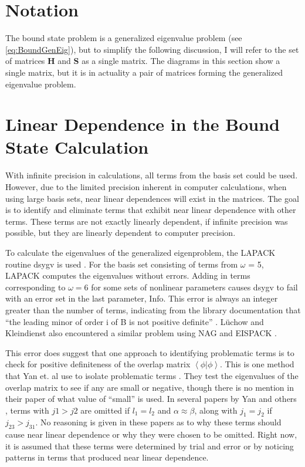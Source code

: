 \documentclass[Dissertation.tex]{subfiles}
\begin{document}
\section{Notation}
\label{sec:CompNotation}
The bound state problem is a generalized eigenvalue problem (see \cref{eq:BoundGenEig}), but to simplify the following discussion, I will refer to the set of matrices \textbf{H} and \textbf{S} as a single matrix. The diagrams in this section show a single matrix, but it is in actuality a pair of matrices forming the generalized eigenvalue problem.

\section{Linear Dependence in the Bound State Calculation}
With infinite precision in calculations, all terms from the basis set could be used. However, due to the limited precision inherent in computer calculations, when using large basis sets, near linear dependences will exist in the matrices. The goal is to identify and eliminate terms that exhibit near linear dependence with other terms. These terms are not exactly linearly dependent, if infinite precision was possible, but they are linearly dependent to computer precision.

To calculate the eigenvalues of the generalized eigenproblem, the LAPACK routine dsygv is used \cite{dsygv}. For the basis set consisting of terms from $\omega$ = 5, LAPACK computes the eigenvalues without errors. Adding in terms corresponding to $\omega = 6$ for some sets of nonlinear parameters causes dsygv to fail with an error set in the last parameter, Info. This error is always an integer greater than the number of terms, indicating from the library documentation that ``the leading minor of order i of B is not positive definite'' \cite{dsygv}. L\"uchow and Kleindienst also encountered a similar problem using NAG and EISPACK \cite{Luchow1993}.

This error does suggest that one approach to identifying problematic terms is to check for positive definiteness of the overlap matrix $\left\langle \phi | \phi \right\rangle$. This is one method that Yan et. al use to isolate problematic terms \cite{Yan1999}. They test the eigenvalues of the overlap matrix to see if any are small or negative, though there is no mention in their paper of what value of ``small'' is used. In several papers by Yan and others \cite{Yan1998,Yan1998a,Yan1999,Drake1995,Yan1997a}, terms with $j1 > j2$ are omitted if $l_1 = l_2$ and $\alpha \approx \beta$, along with $j_1 = j_2$ if $j_{23} > j_{31}$. No reasoning is given in these papers as to why these terms should cause near linear dependence or why they were chosen to be omitted. Right now, it is assumed that these terms were determined by trial and error or by noticing patterns in terms that produced near linear dependence.
\end{document}
